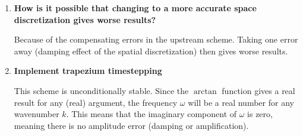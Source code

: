 \documentclass[a4paper,fleqn]{article}
\begin{document}
\begin{enumerate}
\begin{equation*}
\begin{array}{ccccc}
					& \tfrac{\mu}{4}	&	1	&	-\tfrac{\mu}{4}	&	\\
				&&&\ddots&\\
				-\tfrac{\mu}{4}	&&	\cdots	&&	1
			\end{array}\right)
			\left(\begin{array}{c}
				\phi_1	\\	\vdots \\	\phi_{j-1}	\\	\phi_{j}	\\	\phi_{j+1}	\\	\vdots \\ \phi_n
			\end{array}\right)
		\end{equation*}
		If you think writing out this system is hard, try solving it ;-) Although efficient techniques exist for solving tridiagonal systems, it remains a daunting job, especially for 2D or 3D problems.\vspace{2ex}
	\setcounter{enumi}{3}
	\item \textbf{How is it possible that changing to a more accurate space discretization gives worse results?}
		\par
		Because of the compensating errors in the upstream scheme. Taking one error away (damping effect of the spatial discretization) then gives worse results.\vspace{2ex}
	\item \textbf{Implement trapezium timestepping}
		\par
		This scheme is unconditionally stable. Since the $\arctan$ function gives a real result for any (real) argument, the frequency $\omega$ will be a real number for any wavenumber $k$. This means that the imaginary component of $\omega$ is zero, meaning there is no amplitude error (damping or amplification).
\end{enumerate}
%
\end{document}
